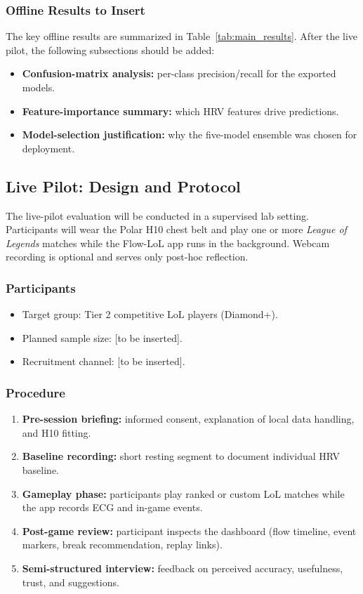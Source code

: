 \subsubsection{Offline Results to Insert}

The key offline results are summarized in Table~\ref{tab:main_results}. After the live pilot, the following subsections should be added:

\begin{itemize}
    \item \textbf{Confusion-matrix analysis:} per-class precision/recall for the exported models.
    \item \textbf{Feature-importance summary:} which HRV features drive predictions.
    \item \textbf{Model-selection justification:} why the five-model ensemble was chosen for deployment.
\end{itemize}

\subsection{Live Pilot: Design and Protocol}

The live-pilot evaluation will be conducted in a supervised lab setting. Participants will wear the Polar H10 chest belt and play one or more \textit{League of Legends} matches while the Flow-LoL app runs in the background. Webcam recording is optional and serves only post-hoc reflection.

\subsubsection{Participants}

\begin{itemize}
    \item Target group: Tier 2 competitive LoL players (Diamond+).
    \item Planned sample size: [to be inserted].
    \item Recruitment channel: [to be inserted].
\end{itemize}

\subsubsection{Procedure}

\begin{enumerate}
    \item \textbf{Pre-session briefing:} informed consent, explanation of local data handling, and H10 fitting.
    \item \textbf{Baseline recording:} short resting segment to document individual HRV baseline.
    \item \textbf{Gameplay phase:} participants play ranked or custom LoL matches while the app records ECG and in-game events.
    \item \textbf{Post-game review:} participant inspects the dashboard (flow timeline, event markers, break recommendation, replay links).
    \item \textbf{Semi-structured interview:} feedback on perceived accuracy, usefulness, trust, and suggestions.
\end{enumerate}

